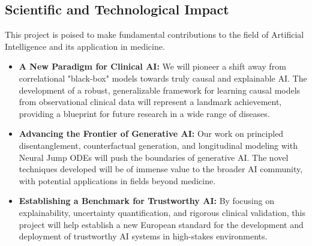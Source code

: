\documentclass[11pt, a4paper]{article}
\begin{document}
\subsection{Scientific and Technological Impact}
This project is poised to make fundamental contributions to the field of Artificial Intelligence and its application in medicine.
\begin{itemize}
    \item \textbf{A New Paradigm for Clinical AI:} We will pioneer a shift away from correlational "black-box" models towards truly causal and explainable AI. The development of a robust, generalizable framework for learning causal models from observational clinical data will represent a landmark achievement, providing a blueprint for future research in a wide range of diseases.
    \item \textbf{Advancing the Frontier of Generative AI:} Our work on principled disentanglement, counterfactual generation, and longitudinal modeling with Neural Jump ODEs will push the boundaries of generative AI. The novel techniques developed will be of immense value to the broader AI community, with potential applications in fields beyond medicine.
    \item \textbf{Establishing a Benchmark for Trustworthy AI:} By focusing on explainability, uncertainty quantification, and rigorous clinical validation, this project will help establish a new European standard for the development and deployment of trustworthy AI systems in high-stakes environments.
\end{itemize}
\end{document}
